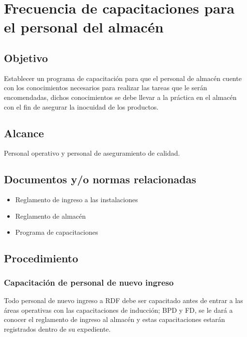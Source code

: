 \thispagestyle{formato-PI}
\renewcommand{\MayorVer}{2}
\renewcommand{\MenorVer}{0}
\renewcommand{\Titulo}{Frecuencia de capacitaciones para el personal del almacén}
\renewcommand{\TipoID}{ESP}
\renewcommand{\FechaPub}{2023--01}

\section{\Titulo}
\renewcommand{\Codigo}{\Prog--\thesection--\TipoID}

\subsection{Objetivo}
Establecer un programa de capacitación para que el personal de almacén cuente con los conocimientos necesarios para realizar las tareas que le serán encomendadas, dichos conocimientos se debe llevar a la práctica en el almacén con el fin de asegurar la inocuidad de los productos.

\subsection{Alcance}
Personal operativo y personal de aseguramiento de calidad.


\subsection{Documentos y/o normas relacionadas}
\begin{itemize}
	\item Reglamento de ingreso a las instalaciones
	\item Reglamento de almacén
	\item Programa de capacitaciones
\end{itemize}

\subsection{Procedimiento}
\subsubsection{Capacitación de personal de nuevo ingreso}

Todo personal de nuevo ingreso a \gls{RDF} debe ser capacitado antes de entrar a las áreas operativas con las capacitaciones de inducción; \gls{BPD} y \gls{FD}, se le dará a conocer el reglamento de ingreso al almacén y estas capacitaciones estarán registrados dentro de su expediente.

